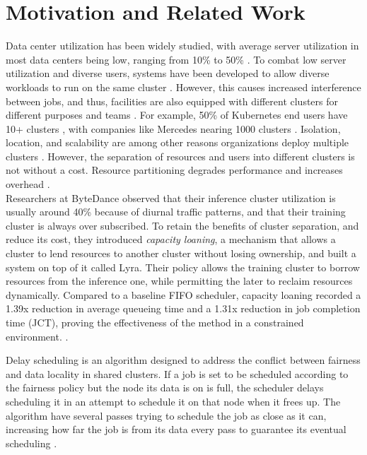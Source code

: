 \section{Motivation and Related Work}
Data center utilization has been widely studied, with average server utilization in most data centers being low, 
ranging from 10\% to 50\%
\cite{lo_heracles_2015}. 
To combat low server utilization and diverse users, systems have been developed to allow diverse workloads to run 
on the same cluster \cite{bhattacharya_hierarchical_2013, hindman_mesos_nodate}. 
However, this causes increased interference between jobs, and thus, 
facilities are also equipped with different clusters for different purposes and teams \cite{patel_what_2022, li_lyra_2023}. 
For example, 50\% of Kubernetes \cite{verma_large-scale_2015}
end users have 10+ clusters \cite{noauthor_cncf_2023} 
, with companies like Mercedes nearing 1000 clusters \cite{noauthor_mercedes-benz_2023}.
Isolation, location, and scalability are among other reasons organizations deploy multiple clusters \cite{google-cloud-blog}.
However, the separation of resources and users into different clusters is not without a cost. 
Resource partitioning degrades performance and increases overhead \cite{adv-dis-mutli}.\\ 
Researchers at ByteDance observed that their inference cluster utilization is usually around 40\% because 
of diurnal traffic patterns, and that their training cluster is always over subscribed. 
To retain the benefits of cluster separation, and reduce its cost, they introduced \textit{capacity loaning}, 
a mechanism that allows a cluster to lend resources to another cluster without losing ownership, and built a system on top 
of it called Lyra.
Their policy allows the training cluster to borrow resources from the inference one, while permitting the 
later to reclaim resources dynamically. 
Compared to a baseline FIFO scheduler, capacity loaning recorded a 1.39x reduction in average queueing time and a 1.31x 
reduction in job completion time (JCT), proving the effectiveness of the method in a constrained environment. \cite{li_lyra_2023}.

Delay scheduling is an algorithm designed to address the conflict between fairness and data locality in 
shared clusters. 
If a job is set to be scheduled according to the fairness policy but the node its data is on is full, 
the scheduler delays scheduling it in an attempt to schedule it on that node when it frees up. The algorithm have 
several passes trying to schedule the job as close as it can, increasing how far the job is from its data every pass 
to guarantee its eventual scheduling \cite{zaharia_delay_2010}.
%

